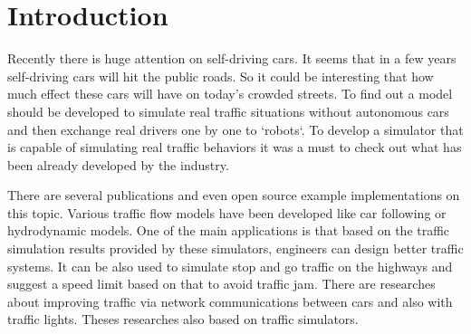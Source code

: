 \chapter{Introduction}
Recently there is huge attention on self-driving cars. It seems that in a few years self-driving cars will hit the public roads. So it could be interesting that how much effect these cars will have on today's crowded streets. To find out a model should be developed to simulate real traffic situations without autonomous cars and then exchange real drivers one by one to `robots`. To develop a simulator that is capable of simulating real traffic behaviors it was a must to check out what has been already developed by the industry.

There are several publications and even open source example implementations on this topic. Various traffic flow models have been developed like car following or hydrodynamic models. One of the main applications is that based on the traffic simulation results provided by these simulators, engineers can design better traffic systems. It can be also used to simulate stop and go traffic on the highways and suggest a speed limit based on that to avoid traffic jam. There are researches about improving traffic via network communications between cars and also with traffic lights. Theses researches also based on traffic simulators.